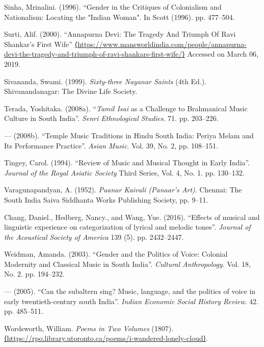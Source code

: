 \begin{thebibliography}{99}
  Sinha, Mrinalini. (1996). “Gender in the Critiques of Colonialism and Nationalism: Locating the "Indian Woman". In Scott (1996). pp. 477--504.

  Surti, Alif. (2000). “Annapurna Devi: The Tragedy And Triumph Of Ravi Shankar’s First Wife” \url{⟨https://www.mansworldindia.com/people/annapurna-devi-the-tragedy-and-triumph-of-ravi-shankars-first-wife/⟩} Accessed on March 06, 2019.

  Sivananda, Swami. (1999). \textit{Sixty-three Nayanar Saints} (4th Ed.). Shivanandanagar: The Divine Life Society.

  Terada, Yoshitaka. (2008a). “\textit{Tamil Isai} as a Challenge to Brahmanical Music Culture in South India”. \textit{Senri Ethnological Studies}. 71. pp. 203--226.

  — (2008b). “Temple Music Traditions in Hindu South India: Periya Melam and Its Performance Practice”. \textit{Asian Music}. Vol. 39, No. 2, pp. 108--151.

  Tingey, Carol. (1994). “Review of Music and Musical Thought in Early India”. \textit{Journal of the Royal Asiatic Society} Third Series, Vol. 4, No. 1. pp. 130--132.

  Varagunapandyan, A. (1952). \textit{Paanar Kaivali (Panaar's Art)}. Chennai: The South India Saiva Siddhanta Works Publishing Society, pp. 9--11.

  Chang, Daniel., Hedberg, Nancy., and Wang, Yue. (2016). “Effects of musical and linguistic experience on categorization of lyrical and melodic tones”. \textit{Journal of the Acoustical Society of America} 139 (5). pp. 2432--2447.

  Weidman, Amanda. (2003). “Gender and the Politics of Voice: Colonial Modernity and Classical Music in South India”. \textit{Cultural Anthropology}. Vol. 18, No. 2. pp. 194--232.

  — (2005). “Can the subaltern sing? Music, language, and the politics of voice in early twentieth-century south India”. \textit{Indian Economic Social History Review}. 42. pp. 485--511.

  Wordsworth, William. \textit{Poems in Two Volumes} (1807). \url{⟨https://rpo.library.utoronto.ca/poems/i-wandered-lonely-cloud⟩}.

 \end{thebibliography}

